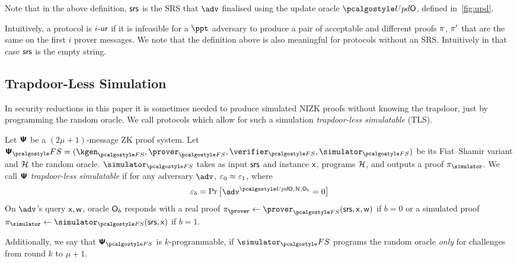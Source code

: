 \begin{definition}
{  }

\end{definition}
Note that in the above definition, $\mathsf{srs}$ is the SRS that $\advse$ finalised using the update oracle $\initU$, defined in~\cref{fig:upd}.

Intuitively, a protocol is ${i\text{-}\mathsf{ur}}$ if it is infeasible for a $\ppt$ adversary
to produce a pair of acceptable and different proofs $\pi$, $\pi'$
that are the same on the first $i$ prover messages.
We note that the definition above is also meaningful for protocols without an SRS. Intuitively in that case $\mathsf{srs}$ is the empty string.

 \subsection{Trapdoor-Less Simulation}
In security reductions in this paper it is sometimes needed to produce
simulated NIZK proofs without knowing the trapdoor, just by
programming the random oracle. We call protocols which allow for such a
simulation \emph{trapdoor-less simulatable} (TLS). 

\begin{definition}
  Let $\bm{\mathsf{\Psi}}$ be a $(2\mu + 1)$-message ZK proof system. Let $\ps_\fs= (\kgen_{\fs}, \prover_{\fs}, \verifier_{\fs}, \simulator_{\fs})$ be its
  Fiat--Shamir variant and $\mathcal{H}$ the random oracle. $\simulator_{\fs}$ takes as input $\mathsf{srs}$
  and instance $\mathsf{x}$, programs $\mathcal{H}$, and outputs a proof $\zkproof_\simulator$.  We
  call $\bm{\mathsf{\Psi}}$ \emph{trapdoor-less simulatable} if for any adversary
  $\adv$, $\varepsilon_0 \approx \varepsilon_1$, where
  \begin{align*}
    \eps_b = \Pr\left[
    \begin{aligned}
      \adv^{\initU,\ro,\oracleo_b} = 0
    \end{aligned}
    \right]
  \end{align*}
  On $\adv$'s query $\mathsf{x}, \mathsf{w}$, oracle $\mathsf{O}_{b}$ responds
  with a real proof $\zkproof_\prover \gets
  \prover_{\fs}(\srs, \inp, \wit)$ if $b = 0$ or a simulated proof $\zkproof_\simulator \gets \simulator_{\fs} (\srs,
  \inp)$ if $b = 1$. 

  Additionally, we say that $\ps_{\fs}$ is $k$-programmable, if $\simulator_\fs$ programs the random oracle \emph{only} for
    challenges from round $k$ to $\mu + 1$.
  \end{definition}

